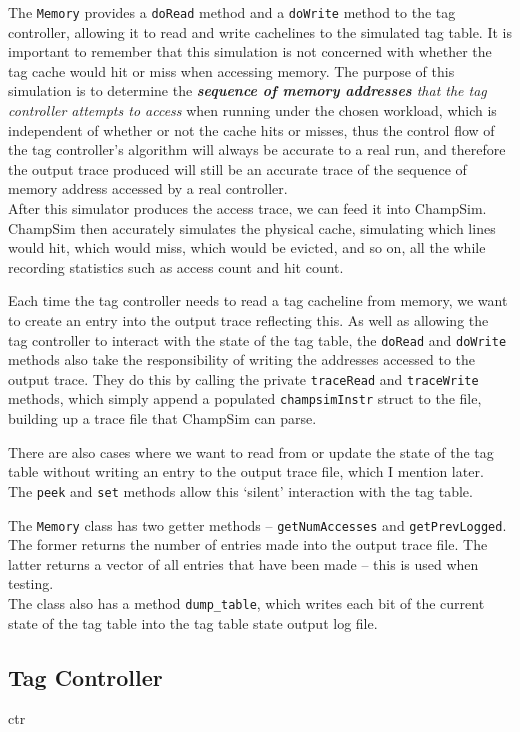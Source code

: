 The \texttt{Memory} provides a \texttt{doRead} method and a \texttt{doWrite} method to the tag controller, allowing it to read and write cachelines to the simulated tag table. It is important to remember that this simulation is not concerned with whether the tag cache would hit or miss when accessing memory. The purpose of this simulation is to determine the \textit{\textbf{sequence of memory addresses} that the tag controller attempts to access} when running under the chosen workload, which is independent of whether or not the cache hits or misses, thus the control flow of the tag controller's algorithm will always be accurate to a real run, and therefore the output trace produced will still be an accurate trace of the sequence of memory address accessed by a real controller.\\
After this simulator produces the access trace, we can feed it into ChampSim. ChampSim then accurately simulates the physical cache, simulating which lines would hit, which would miss, which would be evicted, and so on, all the while recording statistics such as access count and hit count.

Each time the tag controller needs to read a tag cacheline from memory, we want to create an entry into the output trace reflecting this. As well as allowing the tag controller to interact with the state of the tag table, the \texttt{doRead} and \texttt{doWrite} methods also take the responsibility of writing the addresses accessed to the output trace. They do this by calling the private \texttt{traceRead} and \texttt{traceWrite} methods, which simply append a populated \texttt{champsimInstr} struct to the file, building up a trace file that ChampSim can parse.

There are also cases where we want to read from or update the state of the tag table without writing an entry to the output trace file, which I mention later. The \texttt{peek} and \texttt{set} methods allow this `silent' interaction with the tag table.

The \texttt{Memory} class has two getter methods -- \texttt{getNumAccesses} and \texttt{getPrevLogged}. The former returns the number of entries made into the output trace file. The latter returns a vector of all entries that have been made -- this is used when testing.\\
The class also has a method \texttt{dump\_table}, which writes each bit of the current state of the tag table into the tag table state output log file.

\subsection{Tag Controller}
\begin{algorithm}[H]
	\centering
	{ctr}
	\caption{\texttt{Controller} class}
	\label{code:ctr}
\end{algorithm}

